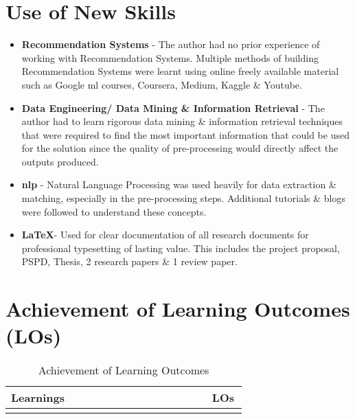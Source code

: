 \section{Use of New Skills}
\begin{itemize}
\item \textbf{Recommendation Systems} - The author had no prior experience of working with Recommendation Systems. Multiple methods of building Recommendation Systems were learnt using online freely available  material such as Google \gls{ml} courses, Coursera, Medium, Kaggle \& Youtube.
\item \textbf{Data Engineering/ Data Mining \& Information Retrieval} - The author had to learn rigorous data mining \& information retrieval techniques that were required to find the most important information that could be used for the solution since the quality of pre-processing would directly affect the outputs produced.
\item \textbf{\gls{nlp}} - Natural Language Processing was used heavily for data extraction \& matching, especially in the pre-processing steps. Additional tutorials \& blogs were followed to understand these concepts.
\item \textbf{\LaTeX }- Used for clear documentation of all research documents for professional typesetting of lasting value. This includes the project proposal, PSPD, Thesis, 2 research papers \& 1 review paper.
\end{itemize}

\section{Achievement of Learning Outcomes (LOs)}

\vspace{-4mm}
\begin{longtable}{|p{0.8\linewidth}|p{0.1471\linewidth}|}
\caption{Achievement of Learning Outcomes}\\ 
\hline
\textbf{Learnings} & \textbf{LOs}\endfirsthead 
\hline
 &  \\
\hline
 & \\
\hline
\end{longtable}

